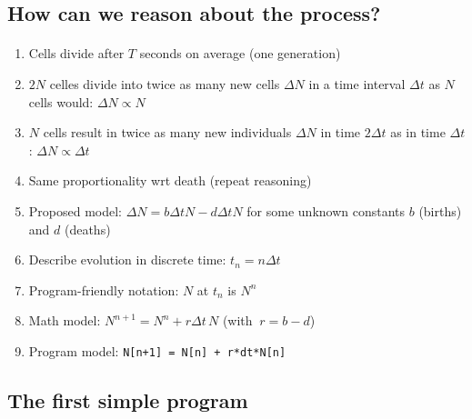 \documentclass[%
twoside,                 %
final,                   %
10pt]{article}
\begin{document}
\subsection*{How can we reason about the process?}



\paragraph{}
\begin{enumerate}
\item Cells divide after $T$ seconds on average (one generation)

\item $2N$ celles divide into twice as many new cells $\Delta N$ in a time
   interval $\Delta t$ as $N$ cells would: $\Delta N \propto N$

\item $N$ cells result in twice as many new individuals $\Delta N$ in
   time $2\Delta t$ as in time $\Delta t$: $\Delta N \propto\Delta t$

\item Same proportionality wrt death (repeat reasoning)

\item Proposed model: $\Delta N = b\Delta t N - d\Delta tN$ for some unknown
   constants $b$ (births) and $d$ (deaths)

\item Describe evolution in discrete time: $t_n=n\Delta t$

\item Program-friendly notation: $N$ at $t_n$ is $N^n$

\item Math model: $N^{n+1} = N^n + r\Delta t\, N$ (with $\ r=b-d$)

\item Program model: \Verb!N[n+1] = N[n] + r*dt*N[n]!
\end{enumerate}

\noindent



\subsection*{The first simple program}
\end{document}
